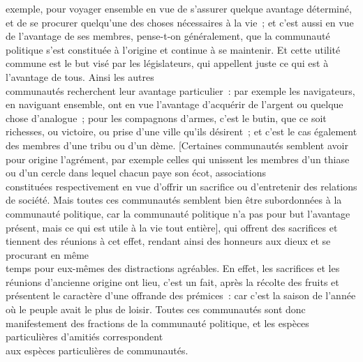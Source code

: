 \documentclass[french,twoside]{book} %
\begin{document}
exemple, pour voyager ensemble en vue de s’assurer quelque avantage déterminé, et de se procurer quelqu’une des choses nécessaires à la vie ; et c’est aussi en vue de l’avantage de ses membres, pense-t-on généralement, que la communauté politique s’est constituée à l’origine et continue à se maintenir. Et cette utilité commune est le but visé par les législateurs, qui appellent juste ce qui est à l’avantage de tous. Ainsi les autres \\
communautés recherchent leur avantage particulier : par exemple les navigateurs, en naviguant ensemble, ont en vue l’avantage d’acquérir de l’argent ou quelque chose d’analogue ; pour les compagnons d’armes, c’est le butin, que ce soit richesses, ou victoire, ou prise d’une ville qu’ils désirent ; et c’est le cas également des membres d’une tribu ou d’un dème. [Certaines communautés semblent avoir pour origine l’agrément, par exemple celles qui unissent les membres d’un thiase ou d’un cercle dans lequel chacun paye son écot, associations \\
constituées respectivement en vue d’offrir un sacrifice ou d’entretenir des relations de société. Mais toutes ces communautés semblent bien être subordonnées à la communauté politique, car la communauté politique n’a pas pour but l’avantage présent, mais ce qui est utile à la vie tout entière], qui offrent des sacrifices et tiennent des réunions à cet effet, rendant ainsi des honneurs aux dieux et se procurant en même \\
temps pour eux-mêmes des distractions agréables. En effet, les sacrifices et les réunions d’ancienne origine ont lieu, c’est un fait, après la récolte des fruits et présentent le caractère d’une offrande des prémices : car c’est la saison de l’année où le peuple avait le plus de loisir. Toutes ces communautés sont donc manifestement des fractions de la communauté politique, et les espèces particulières d’amitiés correspondent \\
aux espèces particulières de communautés.
\end{document}
